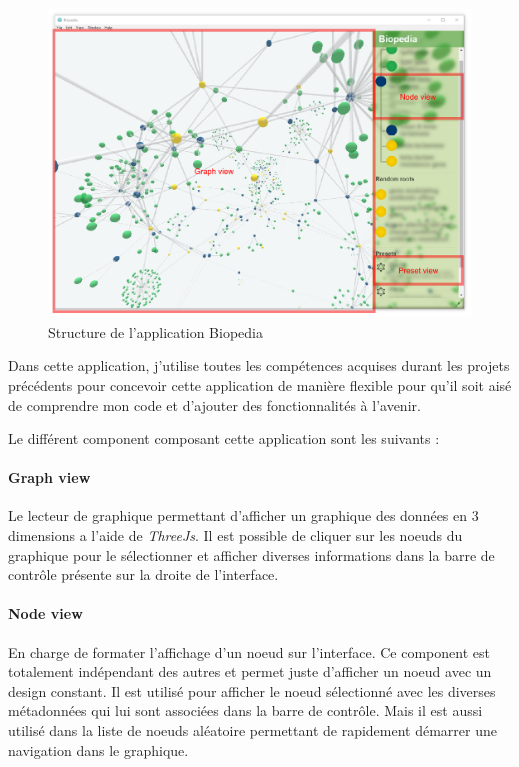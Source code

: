 \begin{figure}[h]
    \centering
    \includegraphics[scale=0.8]{img/biopedia-structure.pdf}
    \caption{Structure de l'application Biopedia}
\end{figure}

Dans cette application, j'utilise toutes les compétences acquises durant les projets précédents pour concevoir cette application de manière flexible pour qu'il soit aisé de comprendre mon code et d'ajouter des fonctionnalités à l'avenir.

\clearpage

Le différent component composant cette application sont les suivants :

\paragraph{Graph view} Le lecteur de graphique permettant d'afficher un graphique des données en 3 dimensions a l'aide de \emph{ThreeJs}.
Il est possible de cliquer sur les noeuds du graphique pour le sélectionner et afficher diverses informations dans la barre de contrôle présente sur la droite de l'interface.

\paragraph{Node view} En charge de formater l'affichage d'un noeud sur l'interface.
Ce component est totalement indépendant des autres et permet juste d'afficher un noeud avec un design constant.
Il est utilisé pour afficher le noeud sélectionné avec les diverses métadonnées qui lui sont associées dans la barre de contrôle.
Mais il est aussi utilisé dans la liste de noeuds aléatoire permettant de rapidement démarrer une navigation dans le graphique.

